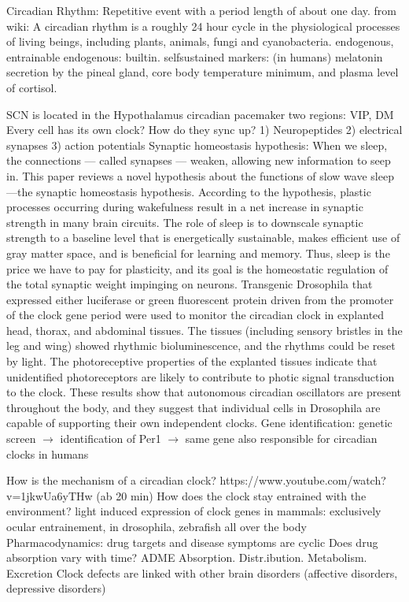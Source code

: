 \documentclass[12pt,article,oneside,a4paper]{memoir}
\begin{document}
Circadian Rhythm: Repetitive event with a period length of about one day. from wiki: A circadian rhythm is a roughly 24 hour cycle in the physiological processes of living beings, including plants, animals, fungi and cyanobacteria. endogenous, entrainable
endogenous: built­in. self­sustained
markers: (in humans)  melatonin secretion by the pineal gland, core body temperature minimum, and plasma level of cortisol.

SCN
is located in the Hypothalamus
circadian pacemaker
two regions: VIP, DM
Every cell has its own clock?
How do they sync up?
1) Neuropeptides
2) electrical synapses
3) action potentials
Synaptic homeostasis hypothesis:
When we sleep, the connections — called synapses — weaken, allowing new information to
seep in.
This paper reviews a novel hypothesis about the functions of slow wave sleep—the synaptic
homeostasis hypothesis. According to the hypothesis, plastic processes occurring during
wakefulness result in a net increase in synaptic strength in many brain circuits. The role of
sleep is to downscale synaptic strength to a baseline level that is energetically sustainable,
makes efficient use of gray matter space, and is beneficial for learning and memory. Thus,
sleep is the price we have to pay for plasticity, and its goal is the homeostatic regulation of
the total synaptic weight impinging on neurons.
Transgenic Drosophila that expressed either luciferase or green fluorescent protein driven
from the promoter of the clock gene period were used to monitor the circadian clock in
explanted head, thorax, and abdominal tissues. The tissues (including sensory bristles in the
leg and wing) showed rhythmic bioluminescence, and the rhythms could be reset by light.
The photoreceptive properties of the explanted tissues indicate that unidentified
photoreceptors are likely to contribute to photic signal transduction to the clock. These
results show that autonomous circadian oscillators are present throughout the body, and they suggest that individual cells in Drosophila are capable of supporting their own
independent clocks. Gene identification: genetic screen $\rightarrow$ identification of Per1 $\rightarrow$ same gene also responsible for circadian clocks in humans

How is the mechanism of a circadian clock?
https://www.youtube.com/watch?v=1jkwUa6yTHw (ab 20 min)
How does the clock stay entrained with the environment?
light induced expression of clock genes in mammals: exclusively ocular entrainement, in drosophila, zebrafish all over the body Pharmacodynamics: drug targets and disease symptoms are cyclic
Does drug absorption vary with time?
ADME
Absorption. Distr.ibution. Metabolism. Excretion
Clock defects are linked with other brain disorders (affective disorders, depressive
disorders)
\end{document}
